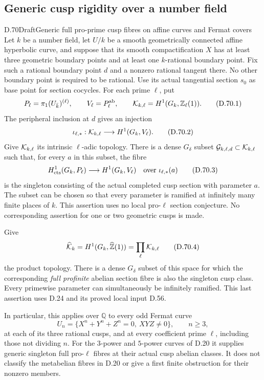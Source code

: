 \subsection{Generic cusp rigidity over a number field}

\begin{statement}{D.70}{Draft}{Generic full pro-prime cusp fibres on affine curves and Fermat covers}
Let \(k\) be a number field, let \(U/k\) be a smooth geometrically
connected affine hyperbolic curve, and suppose that its smooth
compactification \(X\) has at least three geometric boundary
points and at least one \(k\)-rational boundary point.
Fix such a rational boundary point \(d\) and a nonzero rational
tangent there. No other boundary point is required to be rational. Use its
actual tangential section \(s_0\) as base point for section cocycles.
For each prime \(\ell\), put
\[
 P_\ell=\pi_1(U_{\bar k})^{(\ell)},\qquad
 V_\ell=P_\ell^{\rm ab},\qquad
 {\cal K}_{k,\ell}=H^1(G_k,\mathbb Z_\ell(1)).
                                                        \tag{D.70.1}
\]
The peripheral inclusion at \(d\) gives an injection
\[
 \iota_{\ell,*}:{\cal K}_{k,\ell}
                    \longrightarrow H^1(G_k,V_\ell).   \tag{D.70.2}
\]
Give \({\cal K}_{k,\ell}\) its intrinsic \(\ell\)-adic topology.
There is a dense \(G_\delta\) subset
\({\cal G}_{k,\ell,d}\subset{\cal K}_{k,\ell}\) such that, for
every \(a\) in this subset, the fibre
\[
 H^1_{\rm cts}(G_k,P_\ell)\longrightarrow H^1(G_k,V_\ell)
           \quad\hbox{over }\iota_{\ell,*}(a)             \tag{D.70.3}
\]
is the singleton consisting of the actual completed cusp section
with parameter \(a\). The subset can be chosen so that every
parameter is ramified at infinitely many finite places of \(k\).
This assertion uses no local pro-\(\ell\) section conjecture.
No corresponding assertion for one or two geometric cusps is made.

Give
\[
 \widehat{\cal K}_k=H^1(G_k,\widehat{\mathbb Z}(1))
                    =\prod_\ell{\cal K}_{k,\ell}         \tag{D.70.4}
\]
the product topology. There is a dense \(G_\delta\) subset of this
space for which the corresponding \emph{full profinite} abelian
section fibre is also the singleton cusp class. Every primewise
parameter can simultaneously be infinitely ramified. This last
assertion uses D.24 and its proved local input D.56.

In particular, this applies over \(\mathbb Q\) to every odd
Fermat curve
\[
 U_n=\{X^n+Y^n+Z^n=0,\ XYZ\ne0\},\qquad n\ge3,
                                                        \tag{D.70.5}
\]
at each of its three rational cusps, and at every coefficient
prime \(\ell\), including those not dividing \(n\). For the
\(3\)-power and \(5\)-power curves of D.20 it supplies generic
singleton full pro-\(\ell\) fibres at their actual cusp abelian
classes. It does not classify the metabelian fibres in D.20
or give a first finite obstruction for their nonzero members.
\end{statement}

